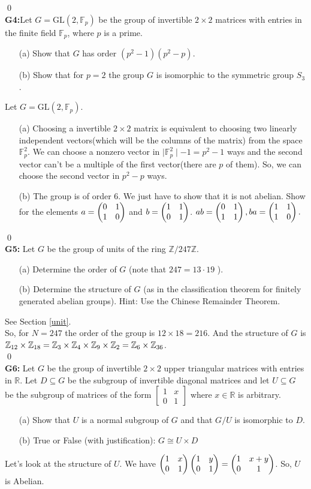 \qed\\
\textbf{G4:}Let $G=\mathrm{GL}\left(2, \mathbb{F}_p\right)$ be the group of invertible $2 \times 2$ matrices with entries in the finite field $\mathbb{F}_p$, where $p$ is a prime.
\begin{itemize}
	\item[(a)] Show that $G$ has order $\left(p^2-1\right)\left(p^2-p\right)$.
	\item[(b)] Show that for $p=2$ the group $G$ is isomorphic to the symmetric group $S_3$.
\end{itemize}
\soln Let $G=\mathrm{GL}\left(2, \mathbb{F}_p\right)$.\\
\begin{itemize}
	\item[(a)] Choosing a invertible $ 2\times2 $ matrix is equivalent to choosing two linearly independent vectors(which will be the columns of the matrix) from the space $ \mathbb{F}_p^2 $. We can choose a nonzero vector in $\mid \mathbb{F}_p^2\mid -1 =  p^2-1 $ ways and the second vector can't be a multiple of the first vector(there are $ p $ of them). So, we can choose the second vector in $ p^2-p $ ways.
	\item[(b)] The group is of order $ 6 $. We just have to show that it is not abelian. Show for the elements $a= \begin{pmatrix} 0 & 1\\ 1 & 0 \end{pmatrix} $ and $b= \begin{pmatrix} 1 & 1\\ 0 & 1 \end{pmatrix} $. $ ab=\begin{pmatrix} 0 & 1\\ 1 & 1 \end{pmatrix}, ba= \begin{pmatrix} 1 & 1\\ 1 & 0 \end{pmatrix}. $
\end{itemize}
\qed\\
\textbf{G5:} Let $G$ be the group of units of the ring $\mathbb{Z} / 247 \mathbb{Z}$.
\begin{itemize}
	\item[(a)] Determine the order of $G$ (note that $247=13 \cdot 19$ ).
	\item[(b)] Determine the structure of $G$ (as in the classification theorem for finitely generated abelian groups). Hint: Use the Chinese Remainder Theorem.
\end{itemize}
\soln See Section \ref{unit}.\\
So, for $ N=247 $ the order of the group is $ 12\times 18=216 $. And the structure of $ G $ is $ \mathbb{Z}_{12} \times \mathbb{Z}_{18}= \mathbb{Z}_{3}\times \mathbb{Z}_4 \times \mathbb{Z}_9 \times \mathbb{Z}_2 = \mathbb{Z}_{6}\times \mathbb{Z}_{36}$.\\
\qed\\
\textbf{G6:} Let $G$ be the group of invertible $2 \times 2$ upper triangular matrices with entries in $\mathbb{R}$. Let $D \subseteq G$ be the subgroup of invertible diagonal matrices and let $U \subseteq G$ be the subgroup of matrices of the form $\left[\begin{array}{ll}1 & x \\ 0 & 1\end{array}\right]$ where $x \in \mathbb{R}$ is arbitrary.
\begin{itemize}
	\item[(a)] Show that $U$ is a normal subgroup of $G$ and that $G / U$ is isomorphic to $D$.
	\item[(b)] True or False (with justification): $G \cong U \times D$
\end{itemize}
\soln
Let's look at the structure of $ U $. We have $ \begin{pmatrix} 1 & x\\ 0 & 1 \end{pmatrix}\begin{pmatrix} 1 & y\\ 0 & 1 \end{pmatrix}= \begin{pmatrix} 1 & x+y\\ 0 & 1 \end{pmatrix} $. So, $ U $ is Abelian.

